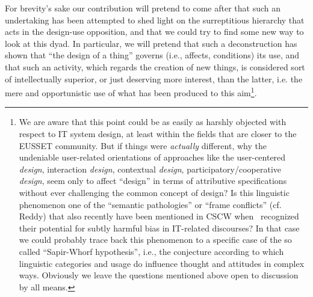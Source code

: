 \documentclass{article}
\begin{document}
For brevity's sake our contribution will pretend to come after that such an undertaking has been attempted to shed light on the surreptitious hierarchy that acts in the design-use opposition, and that we could try to find some new way to look at this dyad. In particular, we will pretend that such a deconstruction has shown that ``the design of a thing'' governs (i.e., affects, conditions) its use, and that such an activity, which regards the creation of new things, is considered sort of intellectually superior, or just deserving more interest, than the latter, i.e. the mere and opportunistic use of what has been produced to this aim\footnote{We are aware that this point could be as easily as harshly objected with respect to IT system design, at least within the fields that are closer to the EUSSET community. But if things were \emph{actually} different, why the undeniable user-related orientations of approaches like the user-centered \emph{design}, interaction \emph{design}, contextual \emph{design}, participatory/cooperative \emph{design}, seem only to affect ``design'' in terms of attributive specifications without ever challenging the common concept of design? Is this linguistic phenomenon one of the ``semantic pathologies'' or ``frame conflicts'' (cf. Reddy) that also recently have been mentioned in CSCW when~\citet{dugdale_trouble_2012} recognized their potential for subtly harmful bias in IT-related discourses? In that case we could probably trace back this phenomenon to a specific case of the so called ``Sapir-Whorf hypothesis'', i.e., the conjecture according to which linguistic categories and usage do influence thought and attitudes in complex ways. Obviously we leave the questions mentioned above open to discussion by all means.}. 
\end{document}
